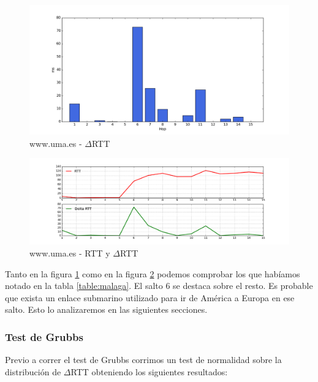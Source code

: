 \begin{figure}[H]
    \begin{center}
        \includegraphics[width=1\textwidth]{data/rtt-malaga-bar.png}
        \caption{www.uma.es - $\Delta$RTT}
        \label{histo:malaga}
    \end{center}
\end{figure}

\begin{figure}[H]
    \begin{center}
        \includegraphics[width=1\textwidth]{data/rtt-malaga-lines.png}
        \caption{www.uma.es - RTT y $\Delta$RTT}
        \label{lines:malaga}
    \end{center}
\end{figure}

Tanto en la figura \ref{histo:malaga} como en la figura \ref{lines:malaga} podemos comprobar los que habíamos notado en la tabla \ref{table:malaga}. El salto 6 se destaca sobre el resto. Es probable que exista un enlace submarino utilizado para ir de América a Europa en ese salto. Esto lo analizaremos en las siguientes secciones.

\subsubsection{Test de Grubbs}\label{malaga:grubbs}

Previo a correr el test de Grubbs corrimos un test de normalidad sobre la distribución de $\Delta$RTT obteniendo los siguientes resultados:


